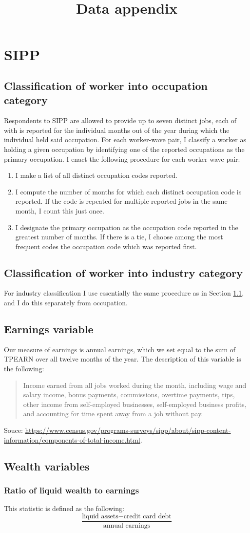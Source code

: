 \documentclass{article}
\title{Data appendix}
\author{}
\date{}
\begin{document}
\maketitle

\section{SIPP}
\subsection{Classification of worker into occupation category}
\label{sipp_occupation}
Respondents to SIPP are allowed to provide up to seven distinct jobs, each of with is reported for the individual months out of the year during which the individual held said occupation.
For each worker-wave pair, I classify a worker as holding a given occupation by identifying one of the reported occupations as the primary occupation. I enact the following procedure for each worker-wave pair:
\begin{enumerate}
\item I make a list of all distinct occupation codes reported.
\item I compute the number of months for which each distinct occupation code is reported. If the code is repeated for multiple reported jobs in the same month, I count this just once.
\item I designate the primary occupation as the occupation code reported in the greatest number of months. If there is a tie, I choose among the most frequent codes the occupation code which was reported first.
\end{enumerate}

\subsection{Classification of worker into industry category}
For industry classification I use essentially the same procedure as in Section \ref{sipp_occupation}, and I do this separately from occupation.

\subsection{Earnings variable}
Our measure of earnings is annual earnings, which we set equal to the sum of TPEARN over all twelve months of the year. The description of this variable is the following:
\begin{quote}
Income earned from all jobs worked during the month, including wage and salary income, bonus payments, commissions, overtime payments, tips, other income from self-employed businesses, self-employed business profits, and accounting for time spent away from a job without pay.
\end{quote}
Souce: \url{https://www.census.gov/programs-surveys/sipp/about/sipp-content-information/components-of-total-income.html}.

\subsection{Wealth variables}
\subsubsection{Ratio of liquid wealth to earnings}
This statistic is defined as the following:
$$
\frac{\text{liquid assets} - \text{credit card debt}}{\text{annual earnings}}
$$
\end{document}
